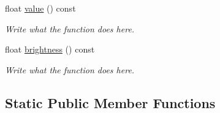 \begin{DoxyCompactItemize}
float \hyperlink{structColor_ac3fd444fb6ff3ef082cfa8978b9df834}{value} () const 
\begin{DoxyCompactList}\small\item\em Write what the function does here. \end{DoxyCompactList}\item 
float \hyperlink{structColor_a7eb1a828a3e3c6a3c5e5843a0413f485}{brightness} () const 
\begin{DoxyCompactList}\small\item\em Write what the function does here. \end{DoxyCompactList}\end{DoxyCompactItemize}
\subsection*{Static Public Member Functions}
